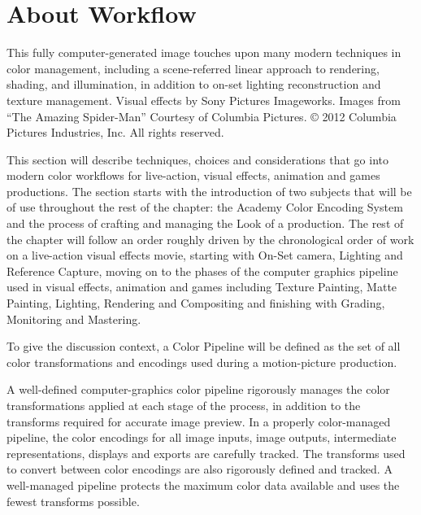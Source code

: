 \section{About Workflow}

This fully computer-generated image touches upon many modern techniques in color management, including a scene-referred linear approach to rendering, shading, and illumination, in addition to on-set lighting reconstruction and texture management.
Visual effects by Sony Pictures Imageworks. Images from “The Amazing Spider-Man” Courtesy of Columbia Pictures. © 2012 Columbia Pictures Industries, Inc. All rights reserved.

This section will describe techniques, choices and considerations that go into modern color workflows for live-action, visual effects, animation and games productions. The section starts with the introduction of two subjects that will be of use throughout the rest of the chapter: the Academy Color Encoding System and the process of crafting and managing the Look of a production. The rest of the chapter will follow an order roughly driven by the chronological order of work on a live-action visual effects movie, starting with On-Set camera, Lighting and Reference Capture, moving on to the phases of the computer graphics pipeline used in visual effects, animation and games including Texture Painting, Matte Painting, Lighting, Rendering and Compositing and finishing with Grading, Monitoring and Mastering.

To give the discussion context, a Color Pipeline will be defined as the set of all color transformations and encodings used during a motion-picture production.

A well-defined computer-graphics color pipeline rigorously manages the color transformations applied at each stage of the process, in addition to the transforms required for accurate image preview.
In a properly color-managed pipeline, the color encodings for all image inputs, image outputs, intermediate representations, displays and exports are carefully tracked. The transforms used to convert between color encodings are also rigorously defined and tracked. A well-managed pipeline protects the maximum color data available and uses the fewest transforms possible.

